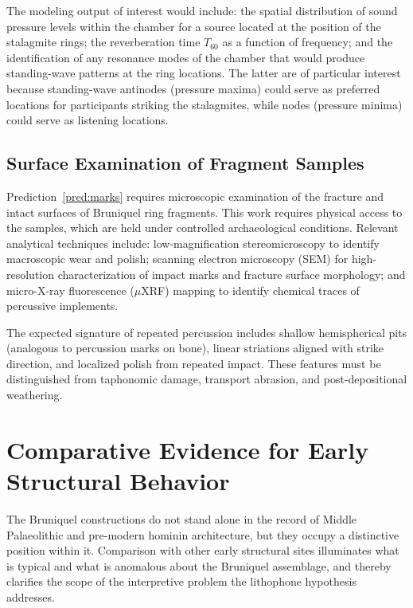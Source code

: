 \documentclass[12pt]{article}
\begin{document}
The modeling output of interest would include: the spatial distribution of sound pressure levels within the chamber for a source located at the position of the stalagmite rings; the reverberation time $T_{60}$ as a function of frequency; and the identification of any resonance modes of the chamber that would produce standing-wave patterns at the ring locations. The latter are of particular interest because standing-wave antinodes (pressure maxima) could serve as preferred locations for participants striking the stalagmites, while nodes (pressure minima) could serve as listening locations.

\subsection{Surface Examination of Fragment Samples}

Prediction~\ref{pred:marks} requires microscopic examination of the fracture and intact surfaces of Bruniquel ring fragments. This work requires physical access to the samples, which are held under controlled archaeological conditions. Relevant analytical techniques include: low-magnification stereomicroscopy to identify macroscopic wear and polish; scanning electron microscopy (SEM) for high-resolution characterization of impact marks and fracture surface morphology; and micro-X-ray fluorescence ($\mu$XRF) mapping to identify chemical traces of percussive implements.

The expected signature of repeated percussion includes shallow hemispherical pits (analogous to percussion marks on bone), linear striations aligned with strike direction, and localized polish from repeated impact. These features must be distinguished from taphonomic damage, transport abrasion, and post-depositional weathering.

\section{Comparative Evidence for Early Structural Behavior}

The Bruniquel constructions do not stand alone in the record of Middle Palaeolithic and pre-modern hominin architecture, but they occupy a distinctive position within it. Comparison with other early structural sites illuminates what is typical and what is anomalous about the Bruniquel assemblage, and thereby clarifies the scope of the interpretive problem the lithophone hypothesis addresses.
\end{document}
